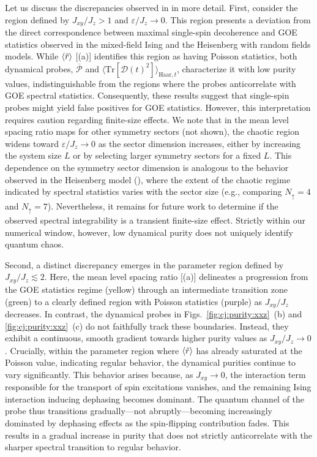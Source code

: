 \documentclass[letterpaper,superscriptaddress,aps,pra,nolongbibliography,showpacs,floatfix,dvipsnames,10pt,twocolumn]{revtex4-2}
\newcommand{\choip}{\langle \text{Tr}[\mathcal{D}(t)^2] \rangle_{\mathrm{Haar}, t}}
\newcommand{\statep}{\overline{\mathcal{P}}}
\begin{document}
Let us discuss the discrepancies observed in 
in more detail. First, consider the region defined by
$J_{xy}/J_z > 1$ and $\varepsilon/J_z \to 0$. This region presents
a deviation from the direct correspondence between
maximal single-spin decoherence and GOE statistics observed in the
mixed-field Ising and the Heisenberg with random fields models. While
$\expval{\tilde{r}}$ [(a)] identifies this
region as having Poisson statistics, both dynamical probes, $\statep$
and $\choip$, characterize it with low purity values,
indistinguishable from the regions where the probes anticorrelate with
GOE spectral statistics. Consequently, these results suggest that
single-spin probes might yield false positives for GOE statistics.
However, this interpretation requires caution regarding finite-size
effects. We note that in the mean level spacing ratio maps for other
symmetry sectors (not shown), the chaotic region widens toward
$\varepsilon/J_z \to 0$ as the sector dimension increases,
either by increasing the system size $L$ or by selecting larger
symmetry sectors for a fixed $L$. This dependence on the symmetry
sector dimension is analogous to the behavior observed in the
Heisenberg model (), where the extent
of the chaotic regime indicated by spectral statistics varies
with the sector size (e.g., comparing $N_{\uparrow}=4$ and $N_{\uparrow}=7$).
Nevertheless, it remains for future work to determine if the observed
spectral integrability is a transient finite-size effect. Strictly
within our numerical window, however, low dynamical purity does not
uniquely identify quantum chaos.

Second, a distinct discrepancy emerges in the parameter region
defined by $J_{xy}/J_z \lesssim 2$. Here, the mean level spacing
ratio [(a)] delineates a progression from
the GOE statistics regime (yellow) through an intermediate transition
zone (green) to a clearly defined region with Poisson statistics (purple) as
$J_{xy}/J_z$ decreases. In contrast, the dynamical probes in
Figs.~\ref{fig:cj:purity:xxz}~(b) and \ref{fig:cj:purity:xxz}~(c) do not
faithfully track these boundaries. Instead, they exhibit a continuous,
smooth gradient towards higher purity values as $J_{xy}/J_z \to 0$.
Crucially, within the parameter region where $\expval{\tilde{r}}$ has
already saturated at the Poisson value, indicating regular behavior, the
dynamical purities continue to vary significantly. This behavior arises
because, as $J_{xy} \to 0$, the interaction term responsible for
the transport of spin excitations vanishes, and the remaining
Ising interaction inducing dephasing becomes dominant.
The quantum channel of the probe thus transitions gradually---not
abruptly---becoming increasingly dominated by dephasing effects as
the spin-flipping contribution fades. This results in a gradual
increase in purity that does not strictly anticorrelate with the
sharper spectral transition to regular behavior.
\end{document}
